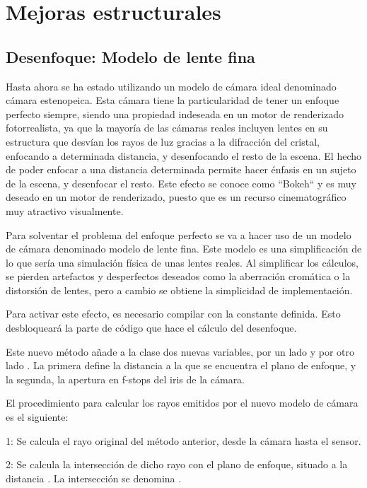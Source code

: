 \chapter{Mejoras estructurales}
	
	\section{Desenfoque: Modelo de lente fina}
	
	Hasta ahora se ha estado utilizando un modelo de cámara ideal denominado cámara estenopeica. Esta cámara tiene la particularidad de tener un enfoque perfecto siempre, siendo una propiedad indeseada en un motor de renderizado fotorrealista, ya que la mayoría de las cámaras reales incluyen lentes en su estructura que desvían los rayos de luz gracias a la difracción del cristal, enfocando a determinada distancia, y desenfocando el resto de la escena. El hecho de poder enfocar a una distancia determinada permite hacer énfasis en un sujeto de la escena, y desenfocar el resto. Este efecto se conoce como ``Bokeh`` y es muy deseado en un motor de renderizado, puesto que es un recurso cinematográfico muy atractivo visualmente.

	Para solventar el problema del enfoque perfecto se va a hacer uso de un modelo de cámara denominado modelo de lente fina. Este modelo es una simplificación de lo que sería una simulación física de unas lentes reales. Al simplificar los cálculos, se pierden artefactos y desperfectos deseados como la aberración cromática o la distorsión de lentes, pero a cambio se obtiene la simplicidad de implementación.

	Para activar este efecto, es necesario compilar con la constante  definida. Esto desbloqueará la parte de código que hace el cálculo del desenfoque. 
	
	Este nuevo método añade a la clase  dos nuevas variables, por un lado  y por otro lado . La primera define la distancia a la que se encuentra el plano de enfoque, y la segunda, la apertura en f-stops del iris de la cámara. 

	El procedimiento para calcular los rayos emitidos por el nuevo modelo de cámara es el siguiente:

	1: Se calcula el rayo original del método anterior, desde la cámara hasta el sensor.
	
	2: Se calcula la intersección de dicho rayo con el plano de enfoque, situado a la distancia . La intersección se denomina .
	
